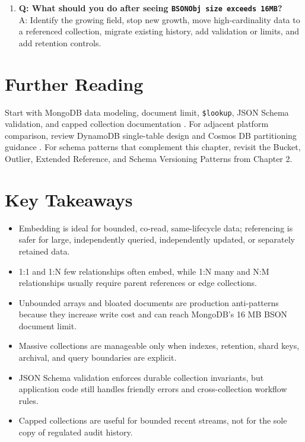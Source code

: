 \begin{enumerate}
    \item \textbf{Q: What should you do after seeing \texttt{BSONObj size exceeds 16MB}?}\\
    A: Identify the growing field, stop new growth, move high-cardinality data to a referenced collection, migrate existing history, add validation or limits, and add retention controls.
\end{enumerate}

\section{Further Reading}
Start with MongoDB data modeling, document limit, \texttt{\$lookup}, JSON Schema validation, and capped collection documentation \cite{mongodbDataModelingDocs,mongodbLimitsDocs,mongodbLookupDocs,mongodbJsonSchemaDocs,mongodbCappedCollectionsDocs}. For adjacent platform comparison, review DynamoDB single-table design and Cosmos DB partitioning guidance \cite{dynamodbSingleTableDocs,cosmosPartitionDocs}. For schema patterns that complement this chapter, revisit the Bucket, Outlier, Extended Reference, and Schema Versioning Patterns from Chapter 2.

\section*{Key Takeaways}
\begin{itemize}
    \item Embedding is ideal for bounded, co-read, same-lifecycle data; referencing is safer for large, independently queried, independently updated, or separately retained data.
    \item 1:1 and 1:N few relationships often embed, while 1:N many and N:M relationships usually require parent references or edge collections.
    \item Unbounded arrays and bloated documents are production anti-patterns because they increase write cost and can reach MongoDB's 16 MB BSON document limit.
    \item Massive collections are manageable only when indexes, retention, shard keys, archival, and query boundaries are explicit.
    \item JSON Schema validation enforces durable collection invariants, but application code still handles friendly errors and cross-collection workflow rules.
    \item Capped collections are useful for bounded recent streams, not for the sole copy of regulated audit history.
\end{itemize}

